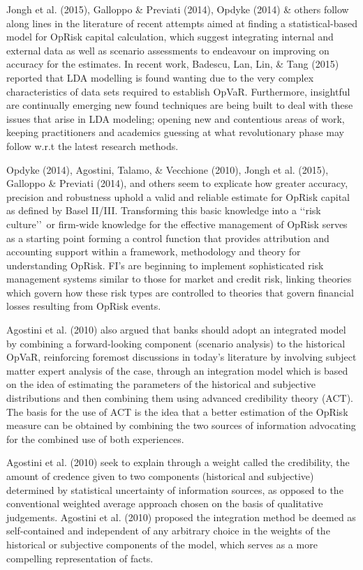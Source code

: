 \documentclass{DissertateUSU}
\begin{document}
Jongh et al. (2015), Galloppo \& Previati (2014), Opdyke (2014) \&
others follow along lines in the literature of recent attempts aimed at
finding a statistical-based model for OpRisk capital calculation, which
suggest integrating internal and external data as well as scenario
assessments to endeavour on improving on accuracy for the estimates. In
recent work, Badescu, Lan, Lin, \& Tang (2015) reported that LDA
modelling is found wanting due to the very complex characteristics of
data sets required to establish OpVaR. Furthermore, insightful are
continually emerging new found techniques are being built to deal with
these issues that arise in LDA modeling; opening new and contentious
areas of work, keeping practitioners and academics guessing at what
revolutionary phase may follow w.r.t the latest research methods.
\medskip

Opdyke (2014), Agostini, Talamo, \& Vecchione (2010), Jongh et al.
(2015), Galloppo \& Previati (2014), and others seem to explicate how
greater accuracy, precision and robustness uphold a valid and reliable
estimate for OpRisk capital as defined by Basel II/III. Transforming
this basic knowledge into a \lq\lq risk culture\rq\rq~or firm-wide
knowledge for the effective management of OpRisk serves as a starting
point forming a control function that provides attribution and
accounting support within a framework, methodology and theory for
understanding OpRisk. FI's are beginning to implement sophisticated risk
management systems similar to those for market and credit risk, linking
theories which govern how these risk types are controlled to theories
that govern financial losses resulting from OpRisk events. \medskip

Agostini et al. (2010) also argued that banks should adopt an integrated
model by combining a forward-looking component (scenario analysis) to
the historical OpVaR, reinforcing foremost discussions in today's
literature by involving subject matter expert analysis of the case,
through an integration model which is based on the idea of estimating
the parameters of the historical and subjective distributions and then
combining them using advanced credibility theory (ACT). The basis for
the use of ACT is the idea that a better estimation of the OpRisk
measure can be obtained by combining the two sources of information
advocating for the combined use of both experiences.\medskip

Agostini et al. (2010) seek to explain through a weight called the
credibility, the amount of credence given to two components (historical
and subjective) determined by statistical uncertainty of information
sources, as opposed to the conventional weighted average approach chosen
on the basis of qualitative judgements. Agostini et al. (2010) proposed
the integration method be deemed as self-contained and independent of
any arbitrary choice in the weights of the historical or subjective
components of the model, which serves as a more compelling
representation of facts.
\end{document}
